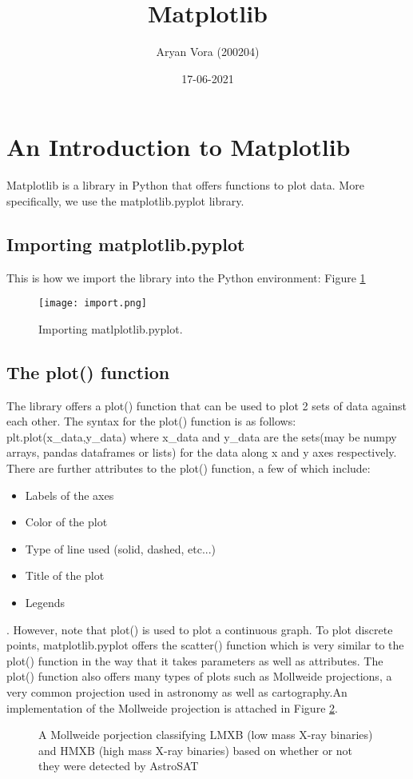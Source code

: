 \documentclass[10pt,a4paper]{article}
\title{Matplotlib}
\author{Aryan Vora (200204)}
\date{ 17-06-2021}
\begin{document}
\maketitle

\section{An Introduction to Matplotlib}
Matplotlib is a library in Python that offers functions to plot data. More specifically, we use the matplotlib.pyplot library.
\subsection{Importing matplotlib.pyplot}
This is how we import the library into the Python environment: Figure
\ref{fig:import1}
\begin{figure}[!h]
\centering
\texttt{[image: import.png]}
\caption{\label{fig:import1}Importing matlplotlib.pyplot.}
\end{figure}
\subsection{The plot() function}
The library offers a plot() function that can be used to plot 2 sets of data against each other. The syntax for the plot() function is as follows:
    plt.plot(x\_data,y\_data)
where x\_data and y\_data are the sets(may be numpy arrays, pandas dataframes or lists) for the data along x and y axes respectively.
There are further attributes to the plot() function, a few of which include:
\begin{itemize}
\item Labels of the axes
\item Color of the plot
\item Type of line used (solid, dashed, etc...)
\item Title of the plot
\item Legends
\end{itemize}
. However, note that plot() is used to plot a continuous graph. To plot discrete points, matplotlib.pyplot offers the scatter() function which is very similar to the plot() function in the way that it takes parameters as well as attributes.
The plot() function also offers many types of plots such as Mollweide projections, a very common projection used in astronomy as well as cartography.An implementation of the Mollweide projection is attached in Figure \ref{fig:example}.
\begin{figure}[!h]
    \centering
    \qquad
    \caption{A Mollweide porjection classifying LMXB (low mass X-ray binaries) and HMXB (high mass X-ray binaries) based on whether or not they were detected by AstroSAT}
    \label{fig:example}
\end{figure}
\end{document}
